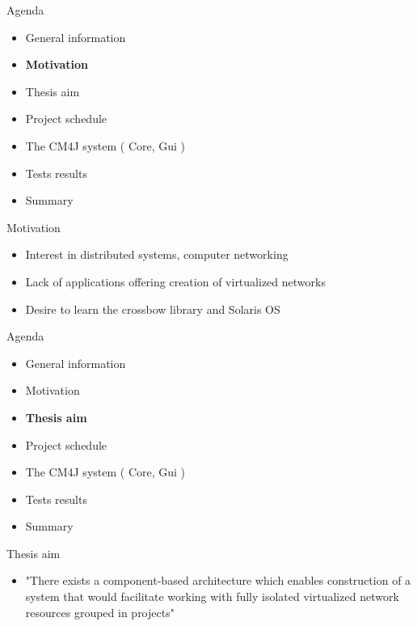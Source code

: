 \documentclass{beamer}
\begin{document}
	\begin{frame}{Agenda}

		\begin{itemize}
			\item General information
			\item \textbf{Motivation}
			\item Thesis aim
			\item Project schedule
			\item The CM4J system ( Core, Gui )
			\item Tests results
			\item Summary
		\end{itemize}

	\end{frame}

	\begin{frame}{Motivation}
		\begin{itemize}
			\item Interest in distributed systems, computer networking
			\item Lack of applications offering creation of virtualized networks
			\item Desire to learn the crossbow library and Solaris OS
		\end{itemize}
	\end{frame}

	\begin{frame}{Agenda}

		\begin{itemize}
			\item General information
			\item Motivation
			\item \textbf{Thesis aim}
			\item Project schedule
			\item The CM4J system ( Core, Gui )
			\item Tests results
			\item Summary
		\end{itemize}

	\end{frame}

	\begin{frame}{Thesis aim}
		\begin{itemize}
			\item "There exists a component-based architecture which enables construction of a system that would facilitate working with fully isolated virtualized network resources grouped in projects"
		\end{itemize}
	\end{frame}
\end{document}
